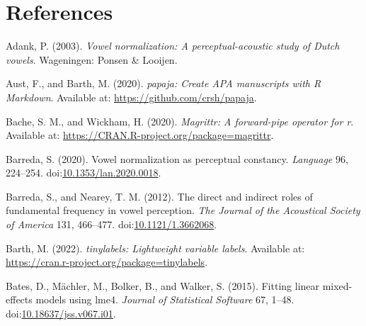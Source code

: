 \documentclass[utf8]{frontiers_suppmat} %
\newlength{\cslhangindent}
\newlength{\cslentryspacingunit} %
\newenvironment{CSLReferences}[2] %
 {%
  \setlength{\parindent}{0pt}
  \ifodd #1
  \let\oldpar\par
  \def\par{\hangindent=\cslhangindent\oldpar}
  \fi
  \setlength{\parskip}{#2\cslentryspacingunit}
 }%
 {}
\begin{document}
\hypertarget{sec:references}{%
%
\section*{References}\label{sec:references}}

\begingroup
\setlength{\parindent}{-0.5in}
\setlength{\leftskip}{0.5in}

\hypertarget{refs}{}
\begin{CSLReferences}{1}{0}
\leavevmode{}%
Adank, P. (2003). \emph{Vowel normalization: A perceptual-acoustic study of {Dutch} vowels}. {Wageningen}: {Ponsen \& Looijen}.

\leavevmode{}%
Aust, F., and Barth, M. (2020). \emph{{papaja}: {Create} {APA} manuscripts with {R Markdown}}. Available at: \url{https://github.com/crsh/papaja}.

\leavevmode{}%
Bache, S. M., and Wickham, H. (2020). \emph{Magrittr: A forward-pipe operator for r}. Available at: \url{https://CRAN.R-project.org/package=magrittr}.

\leavevmode{}%
Barreda, S. (2020). Vowel normalization as perceptual constancy. \emph{Language} 96, 224--254. doi:\href{https://doi.org/10.1353/lan.2020.0018}{10.1353/lan.2020.0018}.

\leavevmode{}%
Barreda, S., and Nearey, T. M. (2012). The direct and indirect roles of fundamental frequency in vowel perception. \emph{The Journal of the Acoustical Society of America} 131, 466--477. doi:\href{https://doi.org/10.1121/1.3662068}{10.1121/1.3662068}.

\leavevmode{}%
Barth, M. (2022). \emph{{tinylabels}: Lightweight variable labels}. Available at: \url{https://cran.r-project.org/package=tinylabels}.

\leavevmode{}%
Bates, D., Mächler, M., Bolker, B., and Walker, S. (2015). Fitting linear mixed-effects models using {lme4}. \emph{Journal of Statistical Software} 67, 1--48. doi:\href{https://doi.org/10.18637/jss.v067.i01}{10.18637/jss.v067.i01}.


\end{CSLReferences}
\end{document}
